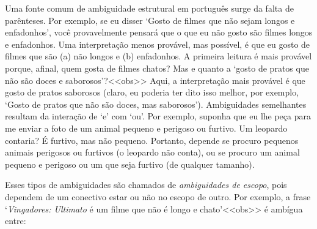 Uma fonte comum de ambiguidade estrutural em português surge da falta de parênteses. Por exemplo, se eu disser `Gosto de filmes que não sejam longos e enfadonhos', você provavelmente pensará que o que eu não gosto são filmes longos e enfadonhos. Uma interpretação menos provável, mas possível, é que eu gosto de filmes que são (a) não longos e (b) enfadonhos. A primeira leitura é mais provável porque, afinal, quem gosta de filmes chatos? Mas e quanto a `gosto de pratos que não são doces e saborosos'?<<obs>> Aqui, a interpretação mais provável é que gosto de pratos saborosos (claro, eu poderia ter dito isso melhor, por exemplo, `Gosto de pratos que não são doces, mas saborosos'). Ambiguidades semelhantes resultam da interação de `e' com `ou'. Por exemplo, suponha que eu lhe peça para me enviar a foto de um animal pequeno e perigoso ou furtivo. Um leopardo contaria? É furtivo, mas não pequeno. Portanto, depende se procuro pequenos animais perigosos ou furtivos (o leopardo não conta), ou se procuro um animal pequeno e perigoso ou um que seja furtivo (de qualquer tamanho).

Esses tipos de ambiguidades são chamados de \emph{ambiguidades de escopo}, pois dependem de um conectivo estar ou não no escopo de outro. Por exemplo, a frase `\emph{Vingadores: Ultimato} é um filme que não é longo e chato'<<obs>> é ambígua entre:

